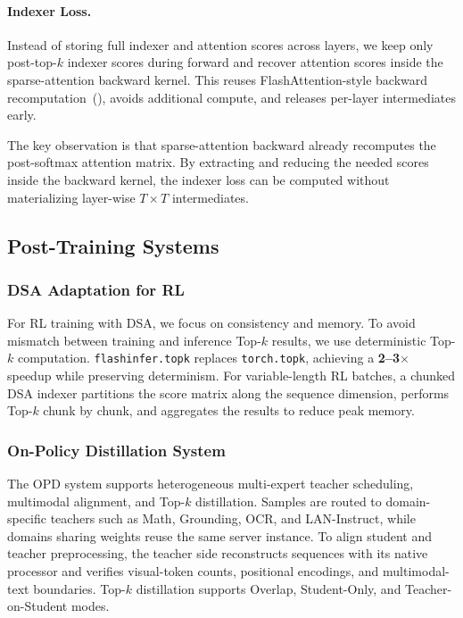 \documentclass{llmxive}
\begin{document}
\paragraph{Indexer Loss.}
Instead of storing full indexer and attention scores across layers, we keep only post-top-$k$ indexer scores during forward and recover attention scores inside the sparse-attention backward kernel. This reuses FlashAttention-style backward recomputation~(\cite{flashattention}), avoids additional compute, and releases per-layer intermediates early.

The key observation is that sparse-attention backward already recomputes the post-softmax attention matrix. By extracting and reducing the needed scores inside the backward kernel, the indexer loss can be computed without materializing layer-wise $T \times T$ intermediates.

\subsection{Post-Training Systems}

\subsubsection{DSA Adaptation for RL}

For RL training with DSA, we focus on consistency and memory. To avoid mismatch between training and inference Top-$k$ results, we use deterministic Top-$k$ computation. \texttt{flashinfer.topk} replaces \texttt{torch.topk}, achieving a \textbf{2--3$\times$} speedup while preserving determinism. For variable-length RL batches, a chunked DSA indexer partitions the score matrix along the sequence dimension, performs Top-$k$ chunk by chunk, and aggregates the results to reduce peak memory.

\subsubsection{On-Policy Distillation System}

The OPD system supports heterogeneous multi-expert teacher scheduling, multimodal alignment, and Top-$k$ distillation. Samples are routed to domain-specific teachers such as Math, Grounding, OCR, and LAN-Instruct, while domains sharing weights reuse the same server instance. To align student and teacher preprocessing, the teacher side reconstructs sequences with its native processor and verifies visual-token counts, positional encodings, and multimodal-text boundaries. Top-$k$ distillation supports Overlap, Student-Only, and Teacher-on-Student modes.
\end{document}
